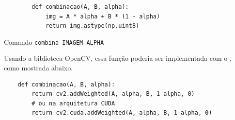 \begin{listing}[H]
    \begin{verbatim}
        def combinacao(A, B, alpha):
            img = A * alpha + B * (1 - alpha)
            return img.astype(np.uint8)
    \end{verbatim}

    \caption{Comando \texttt{combina IMAGEM ALPHA}}
\end{listing}

Usando a biblioteca OpenCV, essa função poderia ser implementada com o  \autocite{ref:addweighted}, como mostrada abaixo.

\begin{verbatim}
    def combinacao(A, B, alpha):
        return cv2.addWeighted(A, alpha, B, 1-alpha, 0)
        # ou na arquitetura CUDA
        return cv2.cuda.addWeighted(A, alpha, B, 1-alpha, 0)
\end{verbatim}
